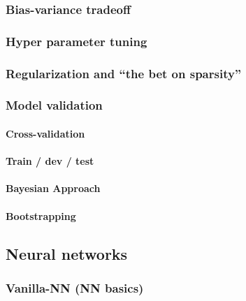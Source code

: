 \documentclass[]{article}
\let\oldparagraph\paragraph
\renewcommand{\paragraph}[1]{\oldparagraph{#1}\mbox{}}
\begin{document}
\subsubsection{Bias-variance tradeoff}\label{bias-variance-tradeoff}

\subsubsection{Hyper parameter tuning}\label{hyper-parameter-tuning}

\subsubsection{\texorpdfstring{Regularization and ``the bet on
sparsity''}{Regularization and the bet on sparsity}}\label{regularization-and-the-bet-on-sparsity}

\subsubsection{Model validation}\label{model-validation}

\paragraph{Cross-validation}\label{cross-validation}

\paragraph{Train / dev / test}\label{train-dev-test}

\paragraph{Bayesian Approach}\label{bayesian-approach}

\paragraph{Bootstrapping}\label{bootstrapping}

\subsection{Neural networks}\label{neural-networks}

\subsubsection{Vanilla-NN (NN basics)}\label{vanilla-nn-nn-basics}
\end{document}
